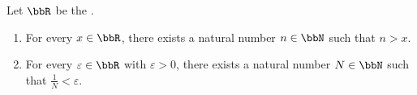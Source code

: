 \begin{proposition} \label{proposition:archimedean_property_of_real_numbers}
    Let $\bbR$ be the .

    \begin{enumerate}
        \item For every $x \in \bbR$, there exists a natural number $n \in \bbN$ such that $n > x$.

        \item For every $\varepsilon \in \bbR$ with $\varepsilon > 0$, there exists a natural number $N \in \bbN$ such that $\frac{1}{N} < \varepsilon$.
    \end{enumerate}
\end{proposition}
